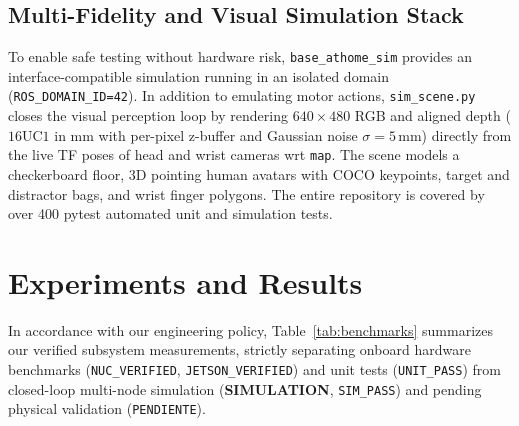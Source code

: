 \documentclass[runningheads,a4paper]{llncs}
\begin{document}
\subsection{Multi-Fidelity and Visual Simulation Stack}
To enable safe testing without hardware risk, \texttt{base\_athome\_sim} provides an interface-compatible simulation running in an isolated domain (\texttt{ROS\_DOMAIN\_ID=42}). In addition to emulating motor actions, \texttt{sim\_scene.py} closes the visual perception loop by rendering $640\times 480$ RGB and aligned depth ($16\text{UC}1$ in mm with per-pixel z-buffer and Gaussian noise $\sigma = 5\,\text{mm}$) directly from the live TF poses of head and wrist cameras wrt \texttt{map}. The scene models a checkerboard floor, 3D pointing human avatars with COCO keypoints, target and distractor bags, and wrist finger polygons. The entire repository is covered by over 400 pytest automated unit and simulation tests.

\section{Experiments and Results}
\label{sec:experiments}
In accordance with our engineering policy, Table~\ref{tab:benchmarks} summarizes our verified subsystem measurements, strictly separating onboard hardware benchmarks (\texttt{NUC\_VERIFIED}, \texttt{JETSON\_VERIFIED}) and unit tests (\texttt{UNIT\_PASS}) from closed-loop multi-node simulation (\textbf{SIMULATION}, \texttt{SIM\_PASS}) and pending physical validation (\texttt{PENDIENTE}).
\end{document}
